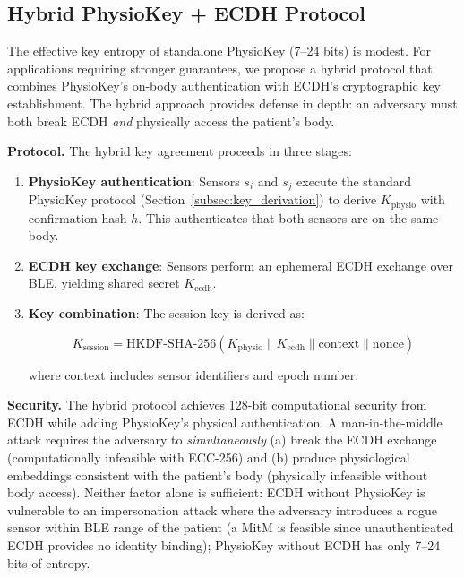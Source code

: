 \documentclass[sensors,article,submit,pdftex,moreauthors]{Definitions/mdpi}
\begin{document}
\subsection{Hybrid PhysioKey + ECDH Protocol}
\label{subsec:hybrid}

The effective key entropy of standalone PhysioKey (7--24 bits) is modest. For applications requiring stronger guarantees, we propose a hybrid protocol that combines PhysioKey's on-body authentication with ECDH's cryptographic key establishment. The hybrid approach provides defense in depth: an adversary must both break ECDH \textit{and} physically access the patient's body.

\textbf{Protocol.} The hybrid key agreement proceeds in three stages:

\begin{enumerate}
    \item \textbf{PhysioKey authentication}: Sensors $s_i$ and $s_j$ execute the standard PhysioKey protocol (Section~\ref{subsec:key_derivation}) to derive $K_{\text{physio}}$ with confirmation hash $h$. This authenticates that both sensors are on the same body.
    \item \textbf{ECDH key exchange}: Sensors perform an ephemeral ECDH exchange over BLE, yielding shared secret $K_{\text{ecdh}}$.
    \item \textbf{Key combination}: The session key is derived as:

    \begin{equation}
    \label{eq:hybrid_key}
    K_{\text{session}} = \text{HKDF-SHA-256}(K_{\text{physio}} \| K_{\text{ecdh}} \| \text{context} \| \text{nonce})
    \end{equation}

    where $\text{context}$ includes sensor identifiers and epoch number.
\end{enumerate}

\textbf{Security.} The hybrid protocol achieves 128-bit computational security from ECDH while adding PhysioKey's physical authentication. A man-in-the-middle attack requires the adversary to \textit{simultaneously} (a) break the ECDH exchange (computationally infeasible with ECC-256) and (b) produce physiological embeddings consistent with the patient's body (physically infeasible without body access). Neither factor alone is sufficient: ECDH without PhysioKey is vulnerable to an impersonation attack where the adversary introduces a rogue sensor within BLE range of the patient (a MitM is feasible since unauthenticated ECDH provides no identity binding); PhysioKey without ECDH has only 7--24 bits of entropy.
\end{document}
